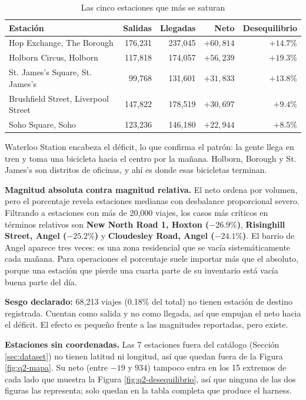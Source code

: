 \begin{table}[htbp]
\centering
\footnotesize
\caption{Las cinco estaciones que más se saturan}
\label{tab:q2-superavit}
\begin{tabular}{lrrrr}
\toprule
Estación & Salidas & Llegadas & Neto & Desequilibrio \\
\midrule
Hop Exchange, The Borough & 176,231 & 237,045 & $+60,814$ & $+14.7\%$ \\
Holborn Circus, Holborn & 117,818 & 174,057 & $+56,239$ & $+19.3\%$ \\
St. James's Square, St. James's & 99,768 & 131,601 & $+31,833$ & $+13.8\%$ \\
Brushfield Street, Liverpool Street & 147,822 & 178,519 & $+30,697$ & $+9.4\%$ \\
Soho Square, Soho & 123,236 & 146,180 & $+22,944$ & $+8.5\%$ \\
\bottomrule
\end{tabular}
\end{table}

Waterloo Station encabeza el déficit, lo que confirma el patrón: la gente llega en tren y toma una bicicleta hacia el centro por la mañana. Holborn, Borough y St. James's son distritos de oficinas, y ahí es donde esas bicicletas terminan.

\textbf{Magnitud absoluta contra magnitud relativa.} El neto ordena por volumen, pero el porcentaje revela estaciones medianas con desbalance proporcional severo. Filtrando a estaciones con más de 20,000 viajes, los casos más críticos en términos relativos son \textbf{New North Road 1, Hoxton ($-26.9\%$)}, \textbf{Risinghill Street, Angel ($-25.2\%$)} y \textbf{Cloudesley Road, Angel ($-24.1\%$)}. El barrio de Angel aparece tres veces: es una zona residencial que se vacía sistemáticamente cada mañana. Para operaciones el porcentaje suele importar más que el absoluto, porque una estación que pierde una cuarta parte de su inventario está vacía buena parte del día.

\textbf{Sesgo declarado:} 68,213 viajes (0.18\% del total) no tienen estación de destino registrada. Cuentan como salida y no como llegada, así que empujan el neto hacia el déficit. El efecto es pequeño frente a las magnitudes reportadas, pero existe.

\textbf{Estaciones sin coordenadas.} Las 7 estaciones fuera del catálogo (Sección \ref{sec:dataset}) no tienen latitud ni longitud, así que quedan fuera de la Figura \ref{fig:q2-mapa}. Su neto (entre $-19$ y $934$) tampoco entra en los 15 extremos de cada lado que muestra la Figura \ref{fig:q2-desequilibrio}, así que ninguna de las dos figuras las representa; solo quedan en la tabla completa que produce el harness.

